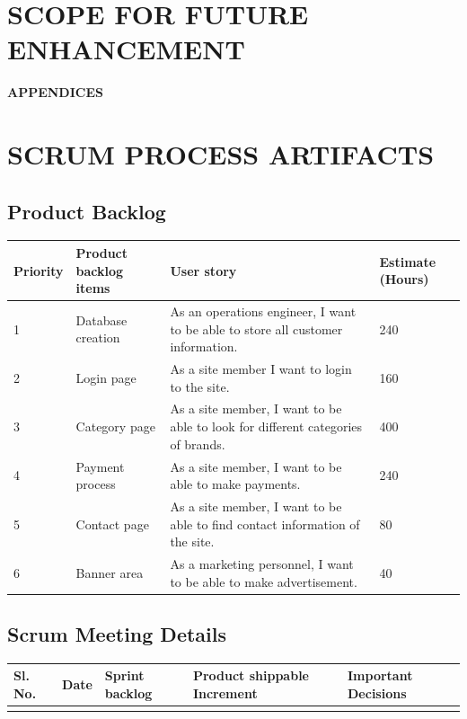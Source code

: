 \chapter{SCOPE FOR FUTURE ENHANCEMENT}
%
%
%
%
\clearpage
{}
\appendix
\quad\vfill
\begin{center}
{\Huge \bf APPENDICES}
\end{center}
\vfill
\clearpage
%
%
%
%
\chapter{SCRUM PROCESS ARTIFACTS}
%
\section{Product Backlog}
%
%
\renewcommand{\arraystretch}{1.25}
\begin{center}
\begin{tabular}{|m{}|m{}|m{}|m{}|}
\hline
{\bf Priority} & {\bf Product backlog items} & {\bf User story} & {\bf Estimate (Hours)}\\
\hline
1 & Database creation & As an operations engineer, I want to be able to store all customer information.  & 240 \\
\hline
2 & Login page & As a site member I want to login to the site. & 160 \\
\hline
3 & Category page & As a site member, I want to be able to look for different categories of brands. & 400\\
\hline
4 & Payment process & As a site member, I want to be able to make payments. & 240\\
\hline
5 & Contact page & As a site member, I want to be able to find contact information of the site. & 80 \\
\hline
6 & Banner area & As a marketing personnel, I want to be able to make advertisement. & 40\\
\hline
\end{tabular}
\end{center}
%
\section{Scrum Meeting Details}
%
\begin{center}
\begin{tabular}{|m{}|m{}|m{}|m{}|m{}|}
\hline
Sl. No. & Date & Sprint backlog & Product shippable Increment & Important Decisions \\
\hline
& & & &  \\
\hline
\end{tabular}
\end{center}

